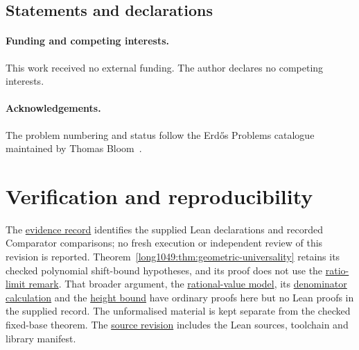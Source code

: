 \subsection*{Statements and declarations}

\paragraph{Funding and competing interests.} This work received no external
funding.  The author declares no competing interests.

\paragraph{Acknowledgements.} The problem numbering and status follow the
Erd\H{o}s Problems catalogue maintained by Thomas Bloom~\cite{erdosproblems}.


\appendix
\section{Verification and reproducibility}\label{long1049:app:index}

The \href{\evidencerecordurl}{evidence record} identifies the supplied
Lean declarations and recorded Comparator comparisons;
no fresh execution or independent review of this revision is
reported. Theorem~\ref{long1049:thm:geometric-universality}
retains its checked polynomial shift-bound hypotheses, and its
proof does not use the \hyperref[long1049:thm:geometric-ratio]{ratio-limit remark}.
That broader argument, the
\hyperref[long1049:thm:calibrated-model]{rational-value model}, its
\hyperref[long1049:thm:calibrated-denominators]{denominator calculation}
and the \hyperref[long1049:prop:calibrated-height]{height bound}
have ordinary proofs here but no Lean proofs in the supplied record. The unformalised material
is kept separate from the checked fixed-base theorem.
The \href{\sourceurl}{source revision} includes the Lean sources,
toolchain and library manifest.
\evidenceparagraph{\evidencerecordurl}

